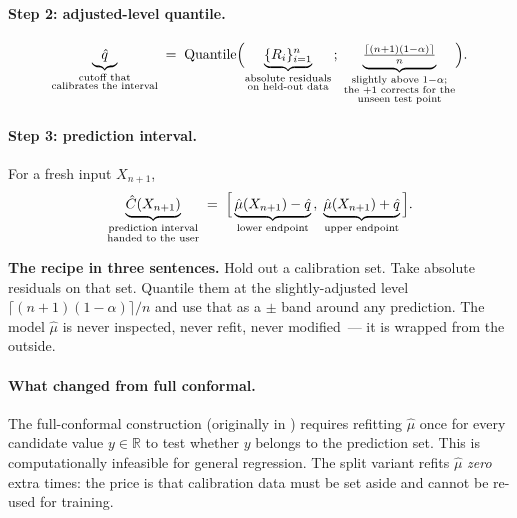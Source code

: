 \documentclass[letterpaper,11pt,leqno]{article}
\begin{document}
\paragraph{Step 2: adjusted-level quantile.}
\begin{equation*}
\underbrace{\hat{q}}_{\substack{\text{cutoff that}\\\text{calibrates the interval}}}
\;=\;
\text{Quantile}\Bigl(
\underbrace{\{R_i\}_{i=1}^{n}}_{\substack{\text{absolute residuals}\\\text{on held-out data}}}
\,;\;
\underbrace{\tfrac{\lceil (n+1)(1-\alpha)\rceil}{n}}_{\substack{\text{slightly above }1-\alpha;\\\text{the }+1\text{ corrects for the}\\\text{unseen test point}}}
\Bigr).
\end{equation*}

\paragraph{Step 3: prediction interval.} For a fresh input $X_{n+1}$,
\begin{equation*}
\underbrace{\hat{C}(X_{n+1})}_{\substack{\text{prediction interval}\\\text{handed to the user}}}
\;=\;
\Bigl[\,
\underbrace{\hat{\mu}(X_{n+1}) - \hat{q}}_{\text{lower endpoint}}
\,,\;
\underbrace{\hat{\mu}(X_{n+1}) + \hat{q}}_{\text{upper endpoint}}
\,\Bigr].
\end{equation*}

\begin{algorithmexplain}
\textbf{The recipe in three sentences.} Hold out a calibration set. Take absolute residuals on that set. Quantile them at the slightly-adjusted level $\lceil(n+1)(1-\alpha)\rceil/n$ and use that as a $\pm$ band around any prediction. The model $\hat{\mu}$ is never inspected, never refit, never modified~--- it is wrapped from the outside.
\end{algorithmexplain}

\paragraph{What changed from full conformal.} The full-conformal construction (originally in \cite{vovk2005algorithmic}) requires refitting $\hat{\mu}$ once for every candidate value $y \in \mathbb{R}$ to test whether $y$ belongs to the prediction set. This is computationally infeasible for general regression. The split variant refits $\hat{\mu}$ \emph{zero} extra times: the price is that calibration data must be set aside and cannot be re-used for training.
\end{document}
